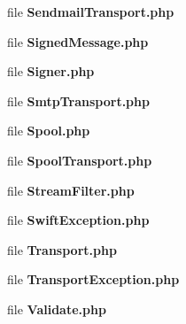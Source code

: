 \begin{DoxyCompactItemize}
file {\bf Sendmail\+Transport.\+php}
\item 
file {\bf Signed\+Message.\+php}
\item 
file {\bf Signer.\+php}
\item 
file {\bf Smtp\+Transport.\+php}
\item 
file {\bf Spool.\+php}
\item 
file {\bf Spool\+Transport.\+php}
\item 
file {\bf Stream\+Filter.\+php}
\item 
file {\bf Swift\+Exception.\+php}
\item 
file {\bf Transport.\+php}
\item 
file {\bf Transport\+Exception.\+php}
\item 
file {\bf Validate.\+php}
\end{DoxyCompactItemize}
